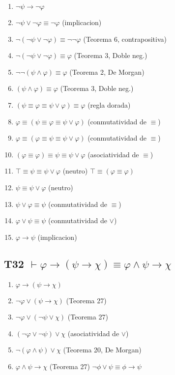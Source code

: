 \documentclass[a4paper,11pt]{article}
\begin{document}
\begin{enumerate}
    \item $\neg\psi \rightarrow \neg\varphi$
    \item $\neg\psi \lor \neg\varphi \equiv \neg\varphi$ \hfill (implicacion)
    \item $\neg(\neg\psi \lor \neg\varphi) \equiv \neg\neg\varphi$ \hfill (Teorema 6, contrapositiva)
    \item $\neg(\neg\psi \lor \neg\varphi) \equiv \varphi$ \hfill (Teorema 3, Doble neg.)
    \item $\neg\neg(\psi \land \varphi) \equiv \varphi$ \hfill (Teorema 2, De Morgan)
    \item $(\psi \land \varphi) \equiv \varphi$ \hfill (Teorema 3, Doble neg.)
    \item $(\psi \equiv \varphi \equiv \psi \lor \varphi) \equiv \varphi$ \hfill (regla dorada)
    \item $\varphi \equiv (\psi \equiv \varphi \equiv \psi \lor \varphi)$ \hfill (conmutatividad de $\equiv$)
    \item $\varphi \equiv (\varphi \equiv \psi \equiv \psi \lor \varphi)$ \hfill (conmutatividad de $\equiv$)
    \item $(\varphi \equiv \varphi) \equiv \psi \equiv \psi \lor \varphi$ \hfill (asociatividad de $\equiv$)
    \item $\top \equiv \psi \equiv \psi \lor \varphi$ \hfill (neutro) $\top \equiv (\varphi \equiv \varphi)$
    \item $\psi \equiv \psi \lor \varphi$ \hfill (neutro)
    \item $\psi \lor \varphi \equiv \psi$ \hfill (conmutatividad de $\equiv$)
    \item $\varphi \lor \psi \equiv \psi$ \hfill (conmutatividad de $\lor$)
    \item $\varphi \rightarrow \psi$ \hfill (implicacion)
\end{enumerate}

\subsection{T32 $\vdash \varphi \rightarrow (\psi \rightarrow \chi) \equiv \varphi \land \psi \rightarrow \chi$}

\begin{enumerate}
    \item $\varphi \rightarrow (\psi \rightarrow \chi)$
    \item $\neg\varphi \lor (\psi \rightarrow \chi)$ \hfill (Teorema 27)
    \item $\neg\varphi \lor (\neg\psi \lor \chi)$ \hfill (Teorema 27)
    \item $(\neg\varphi \lor \neg\psi) \lor \chi$ \hfill (asociatividad de $\lor$)
    \item $\neg(\varphi \land \psi) \lor \chi$ \hfill (Teorema 20, De Morgan)
    \item $\varphi \land \psi \rightarrow \chi$ \hfill (Teorema 27) $\neg\phi \lor \psi \equiv \phi \rightarrow \psi$
\end{enumerate}
\end{document}
